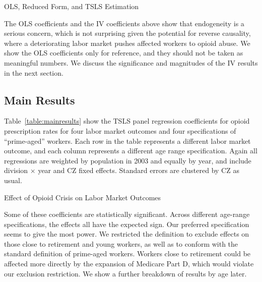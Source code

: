 \documentclass[12pt]{article}
\begin{document}
\begin{table}
    \footnotesize
    \centering
    \caption{OLS, Reduced Form, and TSLS Estimation}
    
    \label{table:tsls}
\end{table}


The OLS coefficients and the IV coefficients above show that endogeneity is a serious concern, which is not surprising given the potential for reverse causality, where a deteriorating labor market pushes affected workers to opioid abuse.  We show the OLS coefficients only for reference, and they should not be taken as meaningful numbers.  We discuss the significance and magnitudes of the IV results in the next section.

\subsection{Main Results}
Table~\ref{table:mainresults} show the TSLS panel regression coefficients for opioid prescription rates for four labor market outcomes and four specifications of ``prime-aged'' workers.  Each row in the table represents a different labor market outcome, and each column represents a different age range specification.  Again all regressions are weighted by population in 2003 and equally by year, and include division $\times$ year and CZ fixed effects.  Standard errors are clustered by CZ as usual.

\begin{table}
    \footnotesize
    \centering
    \caption{Effect of Opioid Crisis on Labor Market Outcomes}
    
    \label{table:mainresults}
\end{table}

Some of these coefficients are statistically significant.  Across different age-range specifications, the effects all have the expected sign.  Our preferred specification seems to give the most power.  We restricted the definition to exclude effects on those close to retirement and young workers, as well as to conform with the standard definition of prime-aged workers.  Workers close to retirement could be affected more directly by the expansion of Medicare Part D, which would violate our exclusion restriction.  We show a further breakdown of results by age later.
\end{document}
